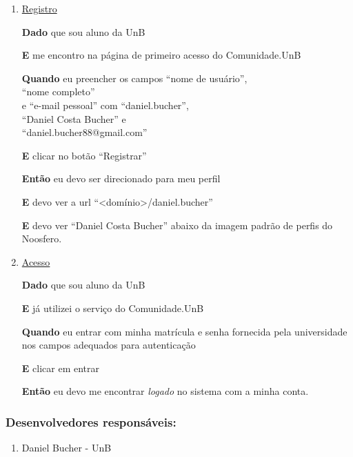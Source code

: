 \begin{enumerate}
\begin{enumerate}
\item \underline{Registro}

\textbf{Dado} que sou aluno da UnB

\textbf{E} me encontro na página de primeiro acesso do Comunidade.UnB

\textbf{Quando} eu preencher os campos
``nome de usuário'',\\
``nome completo''\\
e ``e-mail pessoal'' com ``daniel.bucher'',\\
``Daniel Costa Bucher'' e\\
``daniel.bucher88@gmail.com''

\textbf{E} clicar no botão ``Registrar''

\textbf{Então} eu devo ser direcionado para meu perfil

\textbf{E} devo ver a url ``<domínio>/daniel.bucher''

\textbf{E} devo ver ``Daniel Costa Bucher'' abaixo da imagem padrão de perfis
do Noosfero.


\item \underline{Acesso}

\textbf{Dado} que sou aluno da UnB

\textbf{E} já utilizei o serviço do Comunidade.UnB

\textbf{Quando} eu entrar com minha matrícula e senha fornecida pela universidade
nos campos adequados para autenticação

\textbf{E} clicar em entrar

\textbf{Então} eu devo me encontrar \textit{logado} no sistema com a minha conta.

\end{enumerate}

\end{enumerate}

\subsubsection*{Desenvolvedores responsáveis:}

\begin{enumerate}

\item Daniel Bucher - UnB

\end{enumerate}

